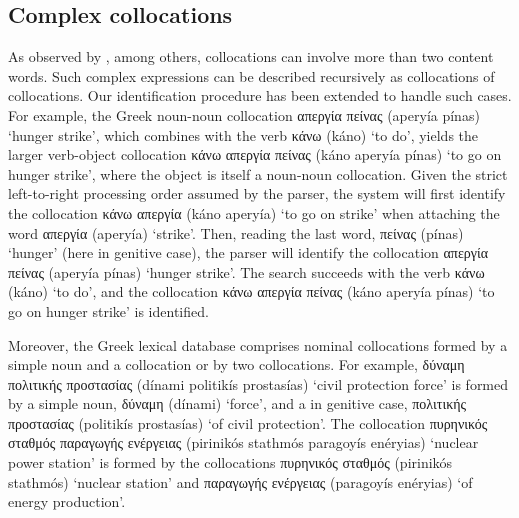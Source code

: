\documentclass[output=paper]{langsci/langscibook}
\begin{document}
\ea\label{fou:ex2}
{\small {} }
\z

\subsection{Complex collocations}
As observed by \cite{heid94}, among others, collocations can involve more than two content words. Such complex expressions can be described recursively as collocations of collocations. Our identification procedure has been extended to handle such cases. For example, the Greek noun-noun collocation {απεργία πείνας} (aperyía pínas) `hunger strike', which combines with the verb {κάνω} (káno) `to do', yields the larger verb-object collocation {κάνω απεργία πείνας} (káno aperyía pínas) `to go on hunger strike', where the object is itself a noun-noun collocation. Given the strict left-to-right processing order assumed by the parser, the system will first identify the collocation {κάνω απεργία} (káno aperyía) `to go on strike' when attaching the word {απεργία} (aperyía) `strike'. Then, reading the last word, {πείνας} (pínas) `hunger' (here in genitive case), the parser will identify the collocation {απεργία πείνας} (aperyía pínas) `hunger strike'. The search succeeds with the verb {κάνω} (káno) `to do', and the collocation {κάνω απεργία πείνας} (káno aperyía pínas) `to go on hunger strike' is identified.

Moreover, the Greek lexical database comprises nominal collocations formed by a simple noun and a collocation or by two collocations. For example, {δύναμη πολιτικής προστασίας} (dínami politikís prostasías) `civil protection force' is for\-med by a simple noun, {δύναμη} (dínami) `force', and a  in genitive case, {πολιτικής προστασίας} (politikís prostasías) `of civil protection'. The collocation {πυρηνικός σταθμός παραγωγής ενέργειας} (pirinikós stathmós para\-goyís enéryias) `nuclear power station' is formed by the collocations {πυρηνικός σταθμός} (pirinikós stathmós) `nuclear station' and {παραγωγής ενέργειας} (para\-goyís enéry\-ias) `of energy production'.  
\end{document}
